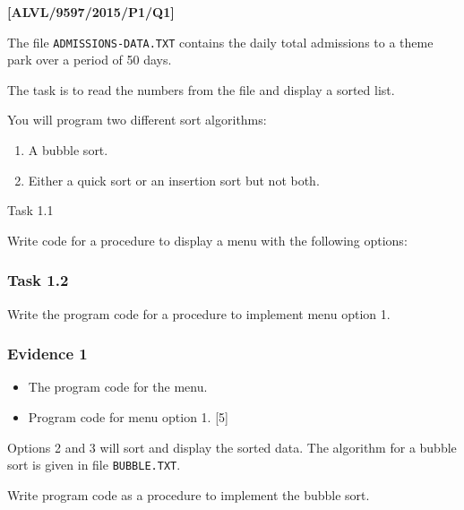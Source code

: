 \item \textbf{{[}ALVL/9597/2015/P1/Q1{]} }

The file \texttt{ADMISSIONS-DATA.TXT} contains the daily total admissions
to a theme park over a period of 50 days. 

The task is to read the numbers from the file and display a sorted
list. 

You will program two different sort algorithms: 
\begin{enumerate}
\item A bubble sort. 
\item Either a quick sort or an insertion sort but not both. 
\end{enumerate}
Task 1.1

Write code for a procedure to display a menu with the following options: 
\begin{center}
\noindent{}
\par\end{center}

\subsubsection*{Task 1.2}

Write the program code for a procedure to implement menu option 1.

\subsubsection*{Evidence 1}
\begin{itemize}
\item The program code for the menu. 
\item Program code for menu option 1. \hfill{}{[}5{]} 
\end{itemize}
Options 2 and 3 will sort and display the sorted data. The algorithm
for a bubble sort is given in file \texttt{BUBBLE.TXT}. 

Write program code as a procedure to implement the bubble sort. 

